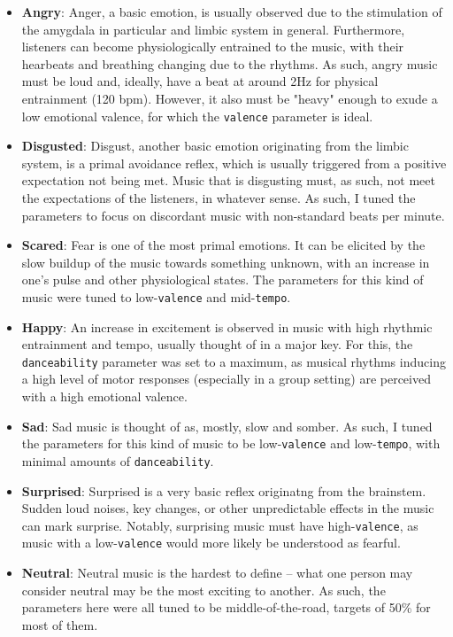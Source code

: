 \documentclass{article}
\renewcommand{\_}[1]{\underline{ #1 }}
\theoremstyle{definition}
\begin{document}
\begin{itemize}
    \item \textbf{Angry}: Anger, a basic emotion, is usually observed due to the stimulation of the amygdala in particular and limbic system in general. Furthermore, listeners can become physiologically entrained to the music, with their hearbeats and breathing changing due to the rhythms. As such, angry music must be loud and, ideally, have a beat at around 2Hz for physical entrainment (120 bpm). However, it also must be "heavy" enough to exude a low emotional valence, for which the \texttt{valence} parameter is ideal.
    \item \textbf{Disgusted}: Disgust, another basic emotion originating from the limbic system, is a primal avoidance reflex, which is usually triggered from a positive expectation not being met. Music that is disgusting must, as such, not meet the expectations of the listeners, in whatever sense. As such, I tuned the parameters to focus on discordant music with non-standard beats per minute.
    \item \textbf{Scared}: Fear is one of the most primal emotions. It can be elicited by the slow buildup of the music towards something unknown, with an increase in one's pulse and other physiological states. The parameters for this kind of music were tuned to low-\texttt{valence} and mid-\texttt{tempo}.
    \item \textbf{Happy}: An increase in excitement is observed in music with high rhythmic entrainment and tempo, usually thought of in a major key. For this, the \texttt{danceability} parameter was set to a maximum, as musical rhythms inducing a high level of motor responses (especially in a group setting) are perceived with a high emotional valence.
    \item \textbf{Sad}: Sad music is thought of as, mostly, slow and somber. As such, I tuned the parameters for this kind of music to be low-\texttt{valence} and low-\texttt{tempo}, with minimal amounts of \texttt{danceability}.
    \item \textbf{Surprised}: Surprised is a very basic reflex originatng from the brainstem. Sudden loud noises, key changes, or other unpredictable effects in the music can mark surprise. Notably, surprising music must have high-\texttt{valence}, as music with a low-\texttt{valence} would more likely be understood as fearful.
    \item \textbf{Neutral}: Neutral music is the hardest to define -- what one person may consider neutral may be the most exciting to another. As such, the parameters here were all tuned to be middle-of-the-road, targets of 50\% for most of them. 
\end{itemize}
\end{document}
